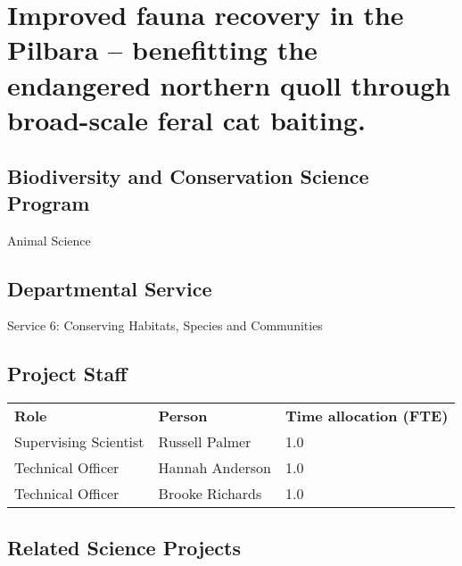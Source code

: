 \documentclass[version=last,
    paper=a4,                               %
    10pt,                                   %
    dvipsnames,
    oneside,                              %
    headings=openany,                       %
    open=any,
    BCOR=7mm,                               %
    DIV=15,     %
]{scrbook}
\begin{document}
\frontmatter
\maketitle
\mainmatter



\section*{Improved fauna recovery in the Pilbara -- benefitting the endangered
northern quoll through broad-scale feral cat baiting.
}



\subsection*{Biodiversity and Conservation Science Program}

Animal Science




\subsection*{Departmental Service}

Service 6: Conserving Habitats, Species and Communities


\subsection*{Project Staff}
\begin{tabu} {X X X}
\textbf{Role} & \textbf{Person} & \textbf{Time allocation (FTE)}\\

Supervising Scientist & Russell Palmer & 1.0\\

Technical Officer & Hannah Anderson & 1.0\\

Technical Officer & Brooke Richards & 1.0\\

\end{tabu}




\subsection*{Related Science Projects}
\end{document}
